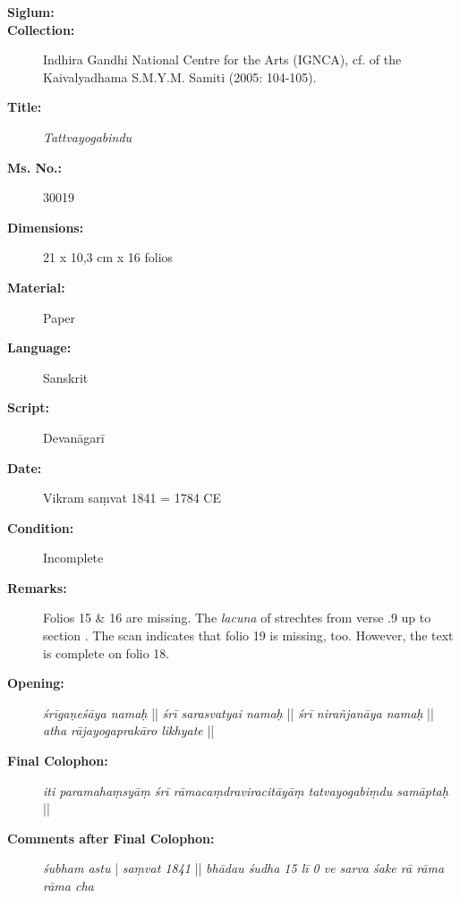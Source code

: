\newpage
\begin{description}
\item[\textbf{Siglum:}] \Huge{} \nocite{ytbd}
\item[\textbf{Collection:}] Indhira Gandhi National Centre for the Arts (IGNCA), cf.  of the Kaivalyadhama S.M.Y.M. Samiti (2005: 104-105). 
\item[\textbf{Title:}] \emph{Tattvayogabindu} 
\item[\textbf{Ms. No.:}] 30019
\item[\textbf{Dimensions:}] 21 x 10,3 cm x 16 folios   
\item[\textbf{Material:}] Paper
\item[\textbf{Language:}] Sanskrit
\item[\textbf{Script:}] Devanāgarī
\item[\textbf{Date:}] Vikram saṃvat 1841 = 1784 CE
\item[\textbf{Condition:}] Incomplete
\item[\textbf{Remarks:}] Folios 15 \& 16 are missing. The \textit{lacuna} of  strechtes from verse .9 up to section . The scan indicates that folio 19 is missing, too. However, the text is complete on folio 18.
\item[\textbf{Opening:}] \textit{śrīgaṇeśāya namaḥ} || \textit{śrī sarasvatyai namaḥ} || \textit{śrī nirañjanāya namaḥ} || \textit{atha rājayogaprakāro likhyate} || 
\item[\textbf{Final Colophon:}] \textit{iti paramahaṃsyāṃ śrī rāmacaṃdraviracitāyāṃ tatvayogabiṃdu samāptaḥ} || 
\item[\textbf{Comments after Final Colophon:}] \textit{śubham astu} | \textit{saṃvat 1841} || \textit{bhādau śudha 15 lī 0 ve sarva śake rā rāma rāma cha}
\end{description}
\newpage
